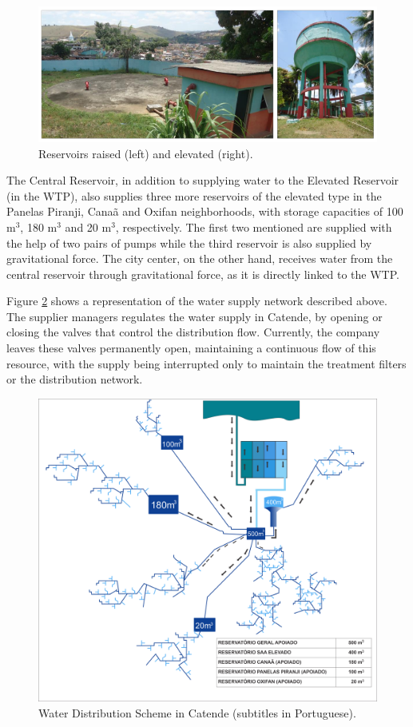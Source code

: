 \documentclass{singlecol}
\theoremstyle{TH}{
\newtheorem{lemma}{Lemma}
\newtheorem{theorem}[lemma]{Theorem}
\newtheorem{corrolary}[lemma]{Corrolary}
\newtheorem{conjecture}[lemma]{Conjecture}
\newtheorem{proposition}[lemma]{Proposition}
\newtheorem{claim}[lemma]{Claim}
\newtheorem{stheorem}[lemma]{Wrong Theorem}
\newtheorem{algorithm}{Algorithm}
}
\theoremstyle{THrm}{
\newtheorem{definition}{Definition}[section]
\newtheorem{question}{Question}[section]
\newtheorem{remark}{Remark}
\newtheorem{scheme}{Scheme}
}
\theoremstyle{THhit}{
\newtheorem{case}{Case}[section]
}
\begin{document}
\begin{figure}[h]
\caption{Reservoirs raised (left) and elevated (right).} 
\label{fig:reservoiresCatende}
\centering
\includegraphics[width=\textwidth]{figures/reservoirs.png}
\end{figure}

The Central Reservoir, in addition to supplying water to the Elevated Reservoir (in the WTP), also supplies three more reservoirs of the elevated type in the Panelas Piranji, Canaã and Oxifan neighborhoods, with storage capacities of 100 m$^3$, 180 m$^3$ and 20 m$^3$, respectively. The first two mentioned are supplied with the help of two pairs of pumps while the third reservoir is also supplied by gravitational force. The city center, on the other hand, receives water from the central reservoir through gravitational force, as it is directly linked to the WTP. 

Figure \ref{fig:WDSCatende} shows a representation of the water supply network described above. The supplier managers regulates the water supply in Catende, by opening or closing the valves that control the distribution flow. Currently, the company leaves these valves permanently open, maintaining a continuous flow of this resource, with the supply being interrupted only to maintain the treatment filters or the distribution network. 

\begin{figure}[h]
\caption{Water Distribution Scheme in Catende (subtitles in Portuguese).}
\label{fig:WDSCatende}
\centering
\includegraphics[width=\textwidth]{figures/esquemaDist.png}
\end{figure}
 
\end{document}
